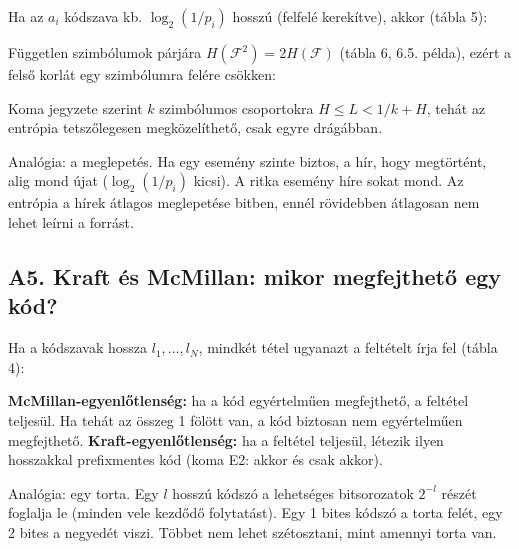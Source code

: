 \begin{center}\end{center}

Ha az $a_i$ kódszava kb. $\log_2(1/p_i)$ hosszú (felfelé kerekítve), akkor (tábla 5):

\begin{center}\end{center}

Független szimbólumok párjára $H(\mathcal F^2)=2H(\mathcal F)$ (tábla 6, 6.5. példa), ezért a felső korlát egy szimbólumra felére csökken:

\begin{center}\end{center}

Koma jegyzete szerint $k$ szimbólumos csoportokra $H \le L < 1/k + H$, tehát az entrópia tetszőlegesen megközelíthető, csak egyre drágábban.

Analógia: a meglepetés. Ha egy esemény szinte biztos, a hír, hogy megtörtént, alig mond újat ($\log_2(1/p_i)$ kicsi). A ritka esemény híre sokat mond. Az entrópia a hírek átlagos meglepetése bitben, ennél rövidebben átlagosan nem lehet leírni a forrást.

\subsection{\texorpdfstring{A5. Kraft és McMillan: mikor megfejthető egy kód?}{A5. Kraft és McMillan: mikor megfejthető egy kód?}}\label{a6-kraft}
Ha a kódszavak hossza $l_1, \dots, l_N$, mindkét tétel ugyanazt a feltételt írja fel (tábla 4):

\begin{center}\end{center}

\textbf{McMillan-egyenlőtlenség:} ha a kód egyértelműen megfejthető, a feltétel teljesül. Ha tehát az összeg 1 fölött van, a kód biztosan nem egyértelműen megfejthető. \textbf{Kraft-egyenlőtlenség:} ha a feltétel teljesül, létezik ilyen hosszakkal prefixmentes kód (koma E2: akkor és csak akkor).

Analógia: egy torta. Egy $l$ hosszú kódszó a lehetséges bitsorozatok $2^{-l}$ részét foglalja le (minden vele kezdődő folytatást). Egy 1 bites kódszó a torta felét, egy 2 bites a negyedét viszi. Többet nem lehet szétosztani, mint amennyi torta van.

